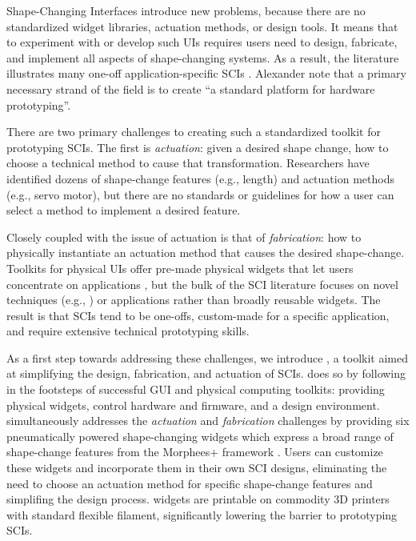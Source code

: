     Shape-Changing Interfaces introduce new problems, because there are no
    standardized widget libraries, actuation methods, or design tools. It
    means that to experiment with or develop such UIs requires users need to
    design, fabricate, and implement all aspects of shape-changing systems. As
    a result, the literature illustrates many one-off application-specific
    SCIs \cite{Sturdee:2018ce}. Alexander \etal note that a primary necessary
    strand of the field is to create ``a standard platform for hardware
    prototyping''.
    
    There are two primary challenges to creating such a standardized toolkit
    for prototyping SCIs. The first is \textit{actuation}: given a
    desired shape change, how to choose a technical method to cause that
    transformation. Researchers have identified dozens of shape-change
    features \cite{10.1145/3173574.3174193} (e.g., length) and actuation
    methods \cite{Sturdee:2018ce} (e.g., servo motor), but there are no
    standards or guidelines for how a user can select a method to implement a
    desired feature.
    
    Closely coupled with the issue of actuation is that of
    \textit{fabrication}: how to physically instantiate an actuation method
    that causes the desired shape-change. Toolkits for physical UIs offer
    pre-made physical widgets that let users concentrate on applications
    \cite{Greenberg:2001,Bdeir:2009kz}, but the bulk of the SCI literature
    focuses on novel techniques (e.g., \cite{Ou:2016}) or applications rather
    than broadly reusable widgets. The result is that SCIs tend to be one-offs,
    custom-made for a specific application, and require extensive technical
    prototyping skills.
  
    As a first step towards addressing these challenges, we introduce \mp, a
    toolkit aimed at simplifying the design, fabrication, and actuation of
    SCIs. \mp does so by following in the footsteps of successful GUI
    and physical computing toolkits: providing physical widgets, control
    hardware and firmware, and a design environment. \mp simultaneously
    addresses the \textit{actuation} and \textit{fabrication} challenges by
    providing six pneumatically powered shape-changing widgets which express a
    broad range of shape-change features from the Morphees+ framework
    \cite{10.1145/3173574.3174193}. Users can customize these widgets and
    incorporate them in their own SCI designs, eliminating the need to choose
    an actuation method for specific shape-change features and simplifing the
    design process. \mp widgets are printable on commodity 3D printers with
    standard flexible filament, significantly lowering the barrier to
    prototyping SCIs. 


